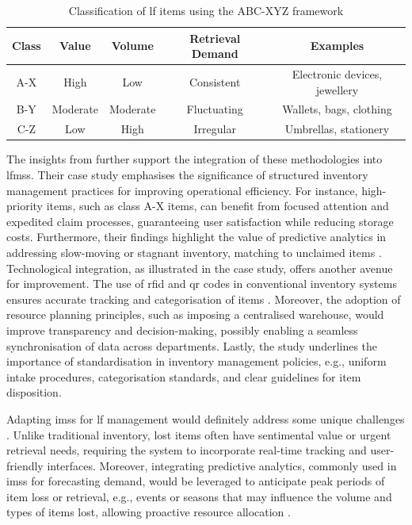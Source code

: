 \begin{table}[H]
\centering
\caption{Classification of \ac{lf} items using the ABC-XYZ framework}
\begin{tabular}{|c|c|c|c|c|}
\hline
\textbf{Class} & \textbf{Value} & \textbf{Volume} & \textbf{Retrieval Demand} & \textbf{Examples} \\ 
\hline
A-X & High & Low & Consistent & Electronic devices, jewellery \\ 
\hline
B-Y & Moderate & Moderate & Fluctuating & Wallets, bags, clothing \\ 
\hline
C-Z & Low & High & Irregular & Umbrellas, stationery \\ 
\hline
\end{tabular}
\label{tab:abc_xyz}
\end{table}

The insights from  further support the integration of these methodologies into \acp{lfms}. Their case study emphasises the significance of structured inventory management practices for improving operational efficiency. For instance, high-priority items, such as class A-X items, can benefit from focused attention and expedited claim processes, guaranteeing user satisfaction while reducing storage costs. Furthermore, their findings highlight the value of predictive analytics in addressing slow-moving or stagnant inventory, matching to unclaimed items \cite{Plinere2016}. Technological integration, as illustrated in the case study, offers another avenue for improvement. The use of \ac{rfid} and \ac{qr} codes in conventional inventory systems ensures accurate tracking and categorisation of items \cite{Plinere2016, Sohail2018}. Moreover, the adoption of resource planning principles, such as imposing a centralised warehouse, would improve transparency and decision-making, possibly enabling a seamless synchronisation of data across departments. Lastly, the  study underlines the importance of standardisation in inventory management policies, e.g., uniform intake procedures, categorisation standards, and clear guidelines for item disposition.

Adapting \acp{ims} for \ac{lf} management would definitely address some unique challenges \cite{Pauliina2024}. Unlike traditional inventory, lost items often have sentimental value or urgent retrieval needs, requiring the system to incorporate real-time tracking and user-friendly interfaces. Moreover, integrating predictive analytics, commonly used in \acp{ims} for forecasting demand, would be leveraged to anticipate peak periods of item loss or retrieval, e.g., events or seasons that may influence the volume and types of items lost, allowing proactive resource allocation \cite{Prabakaran2023}.

